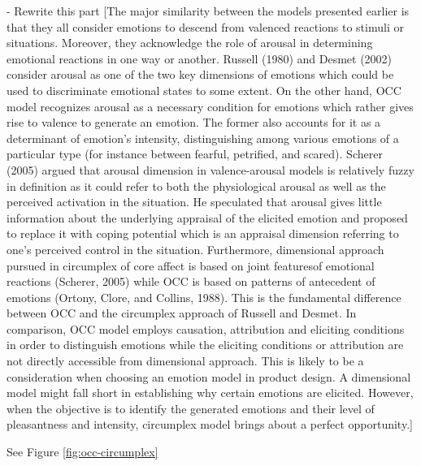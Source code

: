 \documentclass[11pt]{article}
\begin{document}
- Rewrite this part [The major similarity between the models presented earlier
is that they all consider emotions to descend from valenced reactions to stimuli
or situations. Moreover, they acknowledge the role of arousal in determining
emotional reactions in one way or another. Russell (1980) and Desmet (2002)
consider arousal as one of the two key dimensions of emotions which could be
used to discriminate emotional states to some extent. On the other hand, OCC
model recognizes arousal as a necessary condition for emotions which rather
gives rise to valence to generate an emotion. The former also accounts for it as
a determinant of emotion’s intensity, distinguishing among various emotions of a
particular type (for instance between fearful, petrified, and scared). Scherer
(2005) argued that arousal dimension in valence-arousal models is relatively
fuzzy in definition as it could refer to both the physiological arousal as well
as the perceived activation in the situation. He speculated that arousal gives
little information about the underlying appraisal of the elicited emotion and
proposed to replace it with coping potential which is an appraisal dimension
referring to one’s perceived control in the situation. Furthermore, dimensional
approach pursued in circumplex of core affect is based on joint featuresof
emotional reactions (Scherer, 2005) while OCC is based on patterns of antecedent
of emotions (Ortony, Clore, and Collins, 1988). This is the fundamental
difference between OCC and the circumplex approach of Russell and Desmet. In
comparison, OCC model employs causation, attribution and eliciting conditions in
order to distinguish emotions while the eliciting conditions or attribution are
not directly accessible from dimensional approach. This is likely to be a
consideration when choosing an emotion model in product design. A dimensional
model might fall short in establishing why certain emotions are elicited.
However, when the objective is to identify the generated emotions and their
level of pleasantness and intensity, circumplex model brings about a perfect
opportunity.]

See Figure \ref{fig:occ-circumplex}
\end{document}
